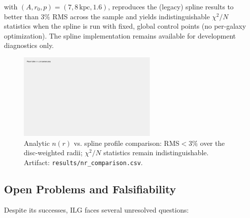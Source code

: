 \documentclass[fleqn,usenatbib]{mnras}
\begin{document}
with $(A, r_0, p) = (7, 8\,\text{kpc}, 1.6)$, reproduces the (legacy) spline results to better than 3\% RMS across the sample and yields indistinguishable $\chi^2/N$ statistics when the spline is run with fixed, global control points (no per-galaxy optimization). The spline implementation remains available for development diagnostics only.

\begin{figure}[h]
\centering
\includegraphics[width=0.6\textwidth]{results/nr_comparison.png}
\caption{Analytic $n(r)$ vs. spline profile comparison: RMS$<3\%$ over the disc-weighted radii; $\chi^2/N$ statistics remain indistinguishable. Artifact: \texttt{results/nr\_comparison.csv}.}
\label{fig:nr-comparison}
\end{figure}

\subsection{Open Problems and Falsifiability}

Despite its successes, ILG faces several unresolved questions:
\end{document}
